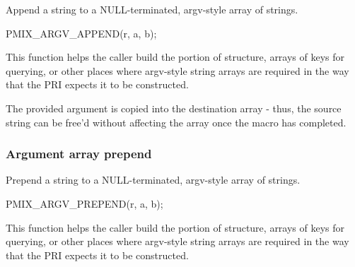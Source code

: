 \summary

Append a string to a NULL-terminated, argv-style array of strings.

\cspecificstart
\begin{codepar}
PMIX_ARGV_APPEND(r, a, b);
\end{codepar}
\cspecificend

\begin{arglist}
\end{arglist}

\descr

This function helps the caller build the  portion of  structure, arrays of keys for querying, or other places where argv-style string arrays are required in the way that the \ac{PRI} expects it to be constructed.

\adviceuserstart
The provided argument is copied into the destination array - thus, the source string can be free'd without affecting the array once the macro has completed.
\adviceuserend

\subsubsection{Argument array prepend}

\summary

Prepend a string to a NULL-terminated, argv-style array of strings.

\cspecificstart
\begin{codepar}
PMIX_ARGV_PREPEND(r, a, b);
\end{codepar}
\cspecificend

\begin{arglist}
\end{arglist}

\descr

This function helps the caller build the  portion of  structure, arrays of keys for querying, or other places where argv-style string arrays are required in the way that the \ac{PRI} expects it to be constructed.

